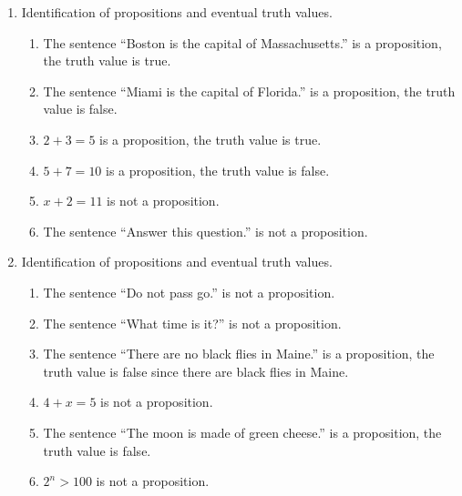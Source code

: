 \documentclass{article}
\begin{document}
\begin{enumerate}[label=\textbf{\arabic*}]

	\item Identification of propositions and eventual truth values.  
  \begin{enumerate}[label=\textbf{\alph*)}]
    \item The sentence ``Boston is the capital of Massachusetts.'' is a proposition, the truth value is true.
    \item The sentence ``Miami is the capital of Florida.'' is a proposition, the truth value is false.
    \item $ 2 + 3 = 5 $ is a proposition, the truth value is true.  
    \item $ 5 + 7 = 10 $ is a proposition, the truth value is false.
    \item $ x + 2 = 11 $ is not a proposition.
    \item The sentence ``Answer this question.'' is not a proposition. 
  \end{enumerate}

  \item Identification of propositions and eventual truth values.
  \begin{enumerate}[label=\textbf{\alph*)}]
    \item The sentence ``Do not pass go.'' is not a proposition.
    \item The sentence ``What time is it?'' is not a proposition.
    \item The sentence ``There are no black flies in Maine.'' is a proposition, the truth value is false since there are black flies in Maine.
    \item $ 4 + x = 5 $ is not a proposition.
    \item The sentence ``The moon is made of green cheese.'' is a proposition, the truth value is false.
    \item  $ 2^n > 100 $ is not a proposition.
  \end{enumerate}
  
\end{enumerate}
  
\end{document}
